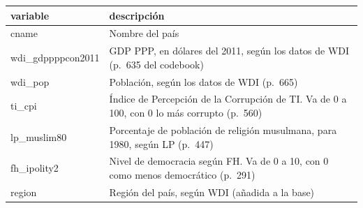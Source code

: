 \documentclass[]{book}
\begin{document}
\begin{longtable}[]{@{}ll@{}}
\toprule
\begin{minipage}[b]{0.16\columnwidth}\raggedright
variable\strut
\end{minipage} & \begin{minipage}[b]{0.79\columnwidth}\raggedright
descripción\strut
\end{minipage}\tabularnewline
\midrule
\endhead
\begin{minipage}[t]{0.16\columnwidth}\raggedright
cname\strut
\end{minipage} & \begin{minipage}[t]{0.79\columnwidth}\raggedright
Nombre del país\strut
\end{minipage}\tabularnewline
\begin{minipage}[t]{0.16\columnwidth}\raggedright
wdi\_gdppppcon2011\strut
\end{minipage} & \begin{minipage}[t]{0.79\columnwidth}\raggedright
GDP PPP, en dólares del 2011, según los datos de WDI (p.~635 del
codebook)\strut
\end{minipage}\tabularnewline
\begin{minipage}[t]{0.16\columnwidth}\raggedright
wdi\_pop\strut
\end{minipage} & \begin{minipage}[t]{0.79\columnwidth}\raggedright
Población, según los datos de WDI (p.~665)\strut
\end{minipage}\tabularnewline
\begin{minipage}[t]{0.16\columnwidth}\raggedright
ti\_cpi\strut
\end{minipage} & \begin{minipage}[t]{0.79\columnwidth}\raggedright
Índice de Percepción de la Corrupción de TI. Va de 0 a 100, con 0 lo más
corrupto (p.~560)\strut
\end{minipage}\tabularnewline
\begin{minipage}[t]{0.16\columnwidth}\raggedright
lp\_muslim80\strut
\end{minipage} & \begin{minipage}[t]{0.79\columnwidth}\raggedright
Porcentaje de población de religión musulmana, para 1980, según LP
(p.~447)\strut
\end{minipage}\tabularnewline
\begin{minipage}[t]{0.16\columnwidth}\raggedright
fh\_ipolity2\strut
\end{minipage} & \begin{minipage}[t]{0.79\columnwidth}\raggedright
Nivel de democracia según FH. Va de 0 a 10, con 0 como menos democrático
(p.~291)\strut
\end{minipage}\tabularnewline
\begin{minipage}[t]{0.16\columnwidth}\raggedright
region\strut
\end{minipage} & \begin{minipage}[t]{0.79\columnwidth}\raggedright
Región del país, según WDI (añadida a la base)\strut
\end{minipage}\tabularnewline
\bottomrule
\end{longtable}
\end{document}
